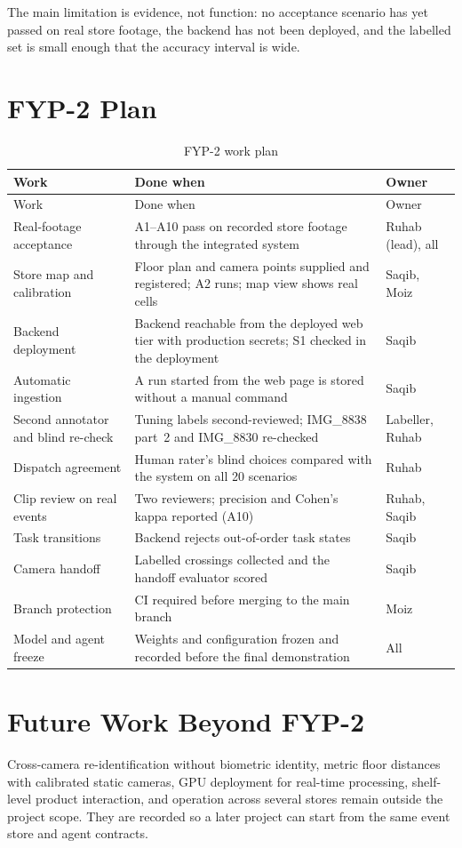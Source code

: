 The main limitation is evidence, not function: no acceptance scenario has yet passed on real store footage, the backend has not been deployed, and the labelled set is small enough that the accuracy interval is wide.

\section{FYP-2 Plan}
\begin{longtable}{P{0.27\textwidth}P{0.45\textwidth}P{0.2\textwidth}}
\caption{FYP-2 work plan}\label{tab:fyp2}\\
\toprule
Work & Done when & Owner\\
\midrule
\endfirsthead
\toprule
Work & Done when & Owner\\
\midrule
\endhead
\bottomrule
\endfoot
Real-footage acceptance & A1--A10 pass on recorded store footage through the integrated system & Ruhab (lead), all\\
Store map and calibration & Floor plan and camera points supplied and registered; A2 runs; map view shows real cells & Saqib, Moiz\\
Backend deployment & Backend reachable from the deployed web tier with production secrets; S1 checked in the deployment & Saqib\\
Automatic ingestion & A run started from the web page is stored without a manual command & Saqib\\
Second annotator and blind re-check & Tuning labels second-reviewed; IMG\_8838 part~2 and IMG\_8830 re-checked & Labeller, Ruhab\\
Dispatch agreement & Human rater's blind choices compared with the system on all 20 scenarios & Ruhab\\
Clip review on real events & Two reviewers; precision and Cohen's kappa reported (A10) & Ruhab, Saqib\\
Task transitions & Backend rejects out-of-order task states & Saqib\\
Camera handoff & Labelled crossings collected and the handoff evaluator scored & Saqib\\
Branch protection & CI required before merging to the main branch & Moiz\\
Model and agent freeze & Weights and configuration frozen and recorded before the final demonstration & All\\
\end{longtable}

\section{Future Work Beyond FYP-2}
Cross-camera re-identification without biometric identity, metric floor distances with calibrated static cameras, GPU deployment for real-time processing, shelf-level product interaction, and operation across several stores remain outside the project scope. They are recorded so a later project can start from the same event store and agent contracts.
